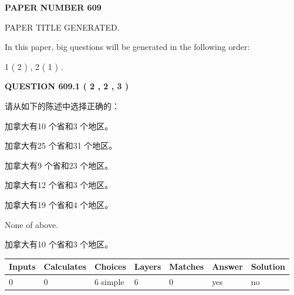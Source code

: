 \documentclass{ctexart}
\begin{document}
   
 {\textbf{ \Large{ PAPER NUMBER  609  }}}
   
   
\vspace{0.2in}
   
   
   
   
   
   
   
   
 \vspace{0.2in}
 
 
 
 
   
   
 PAPER TITLE GENERATED.
   
   
   
\vspace{0.2in}
   
In this paper, big questions will be generated in the following order: 
   
   
   1 ( 2 )
 ,
   2 ( 1 )
 .
  
\vspace{0.2in}
  
{\textbf{\Large{QUESTION
609.1 
 ( 2 , 2 , 3 )
}}}
  
  
请从如下的陈述中选择正确的：
 
 
加拿大有10 个省和3 个地区。
 
 
加拿大有25 个省和31 个地区。
 
 
加拿大有9 个省和23 个地区。
 
 
加拿大有12 个省和3 个地区。
 
 
加拿大有19 个省和4 个地区。
 
 
 None of above.
 
 
\noindent{}
 
 
加拿大有10 个省和3 个地区。
 
 
\noindent{}
 
 
   
   
   
   
\noindent\begin{tabular}{|l|l|l|l|l|l|l|}
 \hline
Inputs & Calculates & Choices & Layers & Matches & Answer & Solution \\ \hline
 0  & 
 0  & 
 6
  simple  
  & 
 6  & 
 0  & 
  yes & 
  no 
  \\ \hline
 \end{tabular}
   
\end{document}
